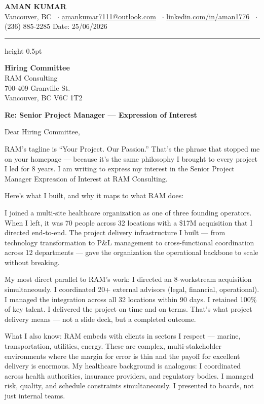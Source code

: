 \documentclass[11pt]{article}
\begin{document}
\noindent \textbf{AMAN KUMAR} \\
Vancouver, BC \ $\cdot$ \href{amankumar7111@outlook.com}{amankumar7111@outlook.com} \ $\cdot$ \href{linkedin.com/in/aman1776}{linkedin.com/in/aman1776} \ $\cdot$ (236) 885-2285 \hfill Date: 25/06/2026

\vspace{8pt}
\hrule height 0.5pt\relax
\vspace{8pt}

\noindent \textbf{Hiring Committee} \\
RAM Consulting \\
700-409 Granville St. \\
Vancouver, BC V6C 1T2

\vspace{8pt}
\noindent \textbf{Re: Senior Project Manager --- Expression of Interest}

\vspace{6pt}
Dear Hiring Committee,

\vspace{4pt}
RAM's tagline is ``Your Project. Our Passion.'' That's the phrase that stopped me on your homepage --- because it's the same philosophy I brought to every project I led for 8 years. I am writing to express my interest in the Senior Project Manager Expression of Interest at RAM Consulting.

\vspace{4pt}
Here's what I built, and why it maps to what RAM does:

\vspace{4pt}
I joined a multi-site healthcare organization as one of three founding operators. When I left, it was 70 people across 32 locations with a \$17M acquisition that I directed end-to-end. The project delivery infrastructure I built --- from technology transformation to P\&L management to cross-functional coordination across 12 departments --- gave the organization the operational backbone to scale without breaking.

\vspace{4pt}
My most direct parallel to RAM's work: I directed an 8-workstream acquisition simultaneously. I coordinated 20+ external advisors (legal, financial, operational). I managed the integration across all 32 locations within 90 days. I retained 100\% of key talent. I delivered the project on time and on terms. That's what project delivery means --- not a slide deck, but a completed outcome.

\vspace{4pt}
What I also know: RAM embeds with clients in sectors I respect --- marine, transportation, utilities, energy. These are complex, multi-stakeholder environments where the margin for error is thin and the payoff for excellent delivery is enormous. My healthcare background is analogous: I coordinated across health authorities, insurance providers, and regulatory bodies. I managed risk, quality, and schedule constraints simultaneously. I presented to boards, not just internal teams.
\end{document}
